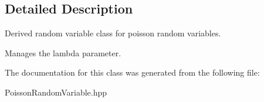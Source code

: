 \subsection{Detailed Description}
Derived random variable class for poisson random variables. 

Manages the lambda parameter. 

The documentation for this class was generated from the following file\+:\begin{DoxyCompactItemize}
\item 
Poisson\+Random\+Variable.\+hpp\end{DoxyCompactItemize}
